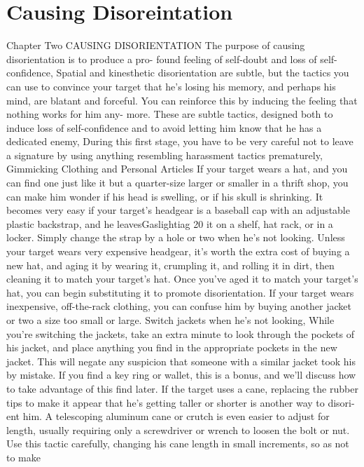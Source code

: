 \documentclass{book}
\begin{document}
\chapter{Causing Disoreintation}
Chapter Two 
CAUSING 
DISORIENTATION 
The purpose of causing disorientation is to produce a pro- 
found feeling of self-doubt and loss of self-confidence, Spatial 
and kinesthetic disorientation are subtle, but the tactics you can 
use to convince your target that he's losing his memory, and 
perhaps his mind, are blatant and forceful. You can reinforce 
this by inducing the feeling that nothing works for him any- 
more. 
These are subtle tactics, designed both to induce loss of 
self-confidence and to avoid letting him know that he has a 
dedicated enemy, During this first stage, you have to be very 
careful not to leave a signature by using anything resembling 
harassment tactics prematurely, 
Gimmicking Clothing 
and Personal Articles 
If your target wears a hat, and you can find one just like it 
but a quarter-size larger or smaller in a thrift shop, you can 
make him wonder if his head is swelling, or if his skull is 
shrinking. It becomes very easy if your target's headgear is a 
baseball cap with an adjustable plastic backstrap, and he leavesGaslightiag 
20 
it on a shelf, hat rack, or in a locker. Simply change the strap by 
a hole or two when he's not looking. 
Unless your target wears very expensive headgear, it's worth 
the extra cost of buying a new hat, and aging it by wearing it, 
crumpling it, and rolling it in dirt, then cleaning it to match 
your target's hat. Once you've aged it to match your target's hat, 
you can begin substituting it to promote disorientation. 
If your target wears inexpensive, off-the-rack clothing, you 
can confuse him by buying another jacket or two a size too 
small or large. Switch jackets when he's not looking, While 
you're switching the jackets, take an extra minute to look 
through the pockets of his jacket, and place anything you find 
in the appropriate pockets in the new jacket. This will negate 
any suspicion that someone with a similar jacket took his by 
mistake. If you find a key ring or wallet, this is a bonus, and 
we'll discuss how to take advantage of this find later. 
If the target uses a cane, replacing the rubber tips to make it 
appear that he's getting taller or shorter is another way to disori- 
ent him. A telescoping aluminum cane or crutch is even easier 
to adjust for length, usually requiring only a screwdriver or 
wrench to loosen the bolt or nut. Use this tactic carefully, 
changing his cane length in small increments, so as not to make 
\end{document}
